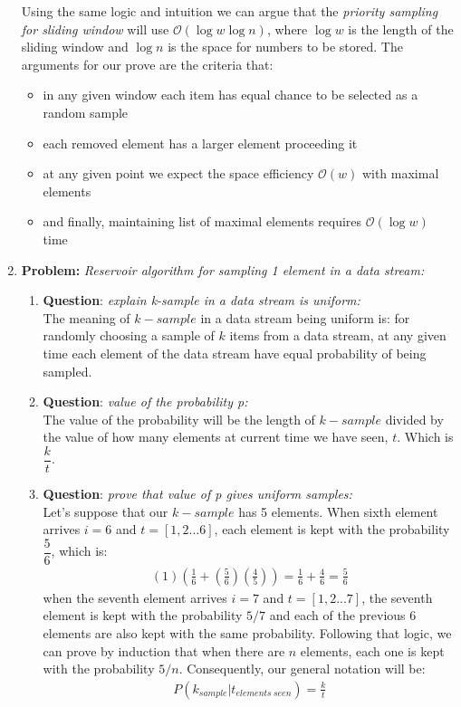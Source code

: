 \documentclass[11pt,a4paper,english]{article}
\begin{document}
\begin{enumerate}
        Using the same logic and intuition we can argue that the \textit{priority sampling for sliding window} will use $\mathcal{O}(\log{w}\log{n})$, where $\log{w}$ is the length of the sliding window and $\log{n}$ is the space for numbers to be stored. The arguments for our prove are the criteria that:
        \begin{itemize}
          \item in any given window each item has equal chance to be selected as a random sample
          \item each removed element has a larger element proceeding it
          \item at any given point we expect the space efficiency $\mathcal{O}(w)$ with maximal elements
          \item and finally, maintaining list of maximal elements requires  $\mathcal{O}(\log{w})$ time
        \end{itemize}
      \item \textbf{Problem:} \textit{Reservoir algorithm for sampling 1 element in a data stream:}
        \begin{enumerate}
          \item \textbf{Question}: \textit{explain k-sample in a data stream is uniform:} \\
            The meaning of $k-sample$ in a data stream being uniform is: for randomly choosing a sample of $k$ items from a data stream, at any given time each element of the data stream have equal probability of being sampled.

          \item \textbf{Question}: \textit{value of the probability p:} \\
            The value of the probability will be the length of $k-sample$ divided by the value of how many elements at current time we have seen, $t$. Which is $\dfrac{k}{t}$.

          \item \textbf{Question}: \textit{prove that value of p gives uniform samples:} \\
            Let's suppose that our $k-sample$ has 5 elements. When sixth element arrives $i=6$ and $t=[1,2...6]$, each element is kept with the probability $\dfrac{5}{6}$, which is:
            \begin{align*}
              (1)(\frac{1}{6} + (\frac{5}{6})(\frac{4}{5})) = \frac{1}{6} + \frac{4}{6} = \frac{5}{6}
            \end{align*}
            when the seventh element arrives $i=7$ and $t=[1,2...7]$, the seventh element is kept with the probability $5/7$ and each of the previous $6$ elements are also kept with the same probability. Following that logic, we can prove by induction that when there are $n$ elements, each one is kept with the probability $5/n$. Consequently, our general notation will be:
            \begin{align*}
              P(k_{sample}|t_{elements\ seen}) = \frac{k}{t}
            \end{align*}


\end{enumerate}
\end{enumerate}
\end{document}
